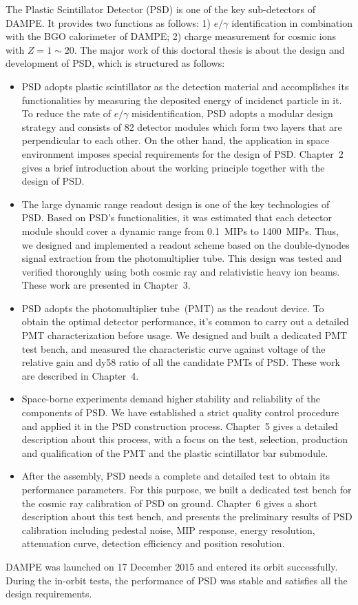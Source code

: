 \begin{eabstract}
The Plastic Scintillator Detector (PSD) is one of the key sub-detectors of DAMPE.
It provides two functions as follows: 1) $e/\gamma$ identification in combination with the BGO calorimeter of DAMPE; 2) charge measurement for cosmic ions with $Z=1\sim 20$.
The major work of this doctoral thesis is about the design and development of PSD, which is structured as follows:
\begin{itemize}
  \item PSD adopts plastic scintillator as the detection material and accomplishes its functionalities by measuring the deposited energy of incidenct particle in it. To reduce the rate of $e/\gamma$ misidentification, PSD adopts a modular design strategy and consists of 82 detector modules which form two layers that are perpendicular to each other. On the other hand, the application in space environment imposes special requirements for the design of PSD. Chapter~2 gives a brief introduction about the working principle together with the design of PSD.
  \item The large dynamic range readout design is one of the key technologies of PSD. Based on PSD's functionalities, it was estimated that each detector module should cover a dynamic range from \SI{0.1}{MIPs} to \SI{1400}{MIPs}. Thus, we designed and implemented a readout scheme based on the double-dynodes signal extraction from the photomultiplier tube. This design was tested and verified thoroughly using both cosmic ray and relativistic heavy ion beams. These work are presented in Chapter~3.
  \item PSD adopts the photomultiplier tube~(PMT) as the readout device. To obtain the optimal detector performance, it's common to carry out a detailed PMT characterization before usage. We designed and built a dedicated PMT test bench, and measured the characteristic curve against voltage of the relative gain and dy58 ratio of all the candidate PMTs of PSD. These work are described in Chapter~4.
  \item Space-borne experiments demand higher stability and reliability of the components of PSD. We have established a strict quality control procedure and applied it in the PSD construction process. Chapter~5 gives a detailed description about this process, with a focus on the test, selection, production and qualification of the PMT and the plastic scintillator bar submodule.
  \item After the assembly, PSD needs a complete and detailed test to obtain its performance parameters. For this purpose, we built a dedicated test bench for the cosmic ray calibration of PSD on ground. Chapter~6 gives a short description about this test bench, and presents the preliminary results of PSD calibration including pedestal noise, MIP response, energy resolution, attenuation curve, detection efficiency and position resolution.
\end{itemize}

DAMPE was launched on 17 December 2015 and entered its orbit successfully. During the in-orbit tests, the performance of PSD was stable and satisfies all the design requirements.
\end{eabstract}

